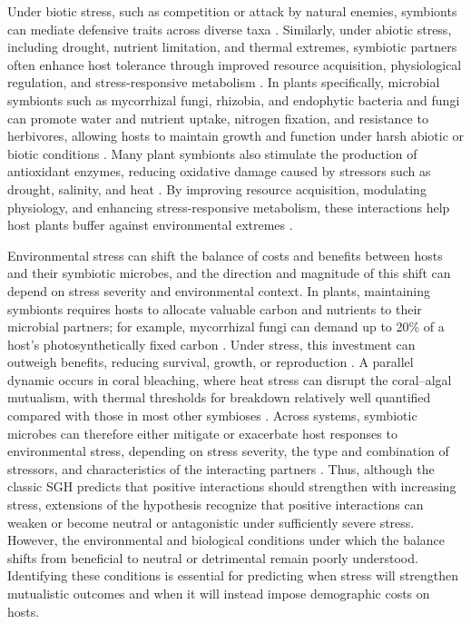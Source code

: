 \documentclass[12pt]{article}\usepackage[]{graphicx}\usepackage[dvipsnames]{xcolor}
\begin{document}
Under biotic stress, such as competition or attack by natural enemies, symbionts can mediate defensive traits across diverse taxa \citep{atala2022fungal,bastias2017epichloe,vega2008insect,haine2008symbiont,florez2015defensive}.
Similarly, under abiotic stress, including drought, nutrient limitation, and thermal extremes, symbiotic partners often enhance host tolerance through improved resource acquisition, physiological regulation, and stress-responsive metabolism \citep{clay2002evolutionary, afkhami2008symbiosis,cesar2024defensive}. 
In plants specifically, microbial symbionts such as mycorrhizal fungi, rhizobia, and endophytic bacteria and fungi can promote water and nutrient uptake, nitrogen fixation, and resistance to herbivores, allowing hosts to maintain growth and function under harsh abiotic or biotic conditions \citep{amijee1989development, friesen2011microbially,van2015mycorrhizal}.
Many plant symbionts also stimulate the production of antioxidant enzymes, reducing oxidative damage caused by stressors such as drought, salinity, and heat \citep{ruiz1996superoxide}. 
By improving resource acquisition, modulating physiology, and enhancing stress-responsive metabolism, these interactions help host plants buffer against environmental extremes \citep{fowler2023geographic,rudgers2020climate,li2026climate}.

Environmental stress can shift the balance of costs and benefits between hosts and their symbiotic microbes, and the direction and magnitude of this shift can depend on stress severity and environmental context.
In plants, maintaining symbionts requires hosts to allocate valuable carbon and nutrients to their microbial partners; for example, mycorrhizal fungi can demand up to 20\% of a host's photosynthetically fixed carbon \citep{thirkell2020carbon,soudzilovskaia2015quantitative}.
Under stress, this investment can outweigh benefits, reducing survival, growth, or reproduction \citep{johnson1997functioning,bronstein2001exploitation,klironomos2003variation}.
A parallel dynamic occurs in coral bleaching, where heat stress can disrupt the coral--algal mutualism, with thermal thresholds for breakdown relatively well quantified compared with those in most other symbioses \citep{evensen2022empirically,vidal2009coral,marangon2025destabilization}. Across systems, symbiotic microbes can therefore either mitigate or exacerbate host responses to environmental stress, depending on stress severity, the type and combination of stressors, and characteristics of the interacting partners \citep{david2018microbial,michalet2007highlighting,kawai2007testing,le2010interaction}. Thus, although the classic SGH predicts that positive interactions should strengthen with increasing stress, extensions of the hypothesis recognize that positive interactions can weaken or become neutral or antagonistic under sufficiently severe stress.
However, the environmental and biological conditions under which the balance shifts from beneficial to neutral or detrimental remain poorly understood. Identifying these conditions is essential for predicting when stress will strengthen mutualistic outcomes and when it will instead impose demographic costs on hosts.
\end{document}
